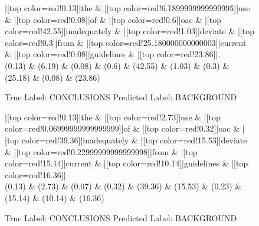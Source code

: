 \documentclass[a4paper, landscape]{article}
\begin{document}
\begin{figure}
\begin{center}
\begin{dependency}
\begin{deptext}
|[top color=red!0.13]|the \& |[top color=red!6.1899999999999995]|use \& |[top color=red!0.08]|of \& |[top color=red!0.6]|oac \& |[top color=red!42.55]|inadequately \& |[top color=red!1.03]|deviate \& |[top color=red!0.3]|from \& |[top color=red!25.180000000000003]|current \& |[top color=red!0.08]|guidelines \& |[top color=red!23.86]|.\\
(0.13) \& (6.19) \& (0.08) \& (0.6) \& (42.55) \& (1.03) \& (0.3) \& (25.18) \& (0.08) \& (23.86)\\
\end{deptext}
\end{dependency}
\end{center}
\caption{True Label: CONCLUSIONS Predicted Label: BACKGROUND}
\end{figure}
\clearpage
\begin{figure}
\begin{center}
\begin{dependency}
\begin{deptext}
|[top color=red!0.13]|the \& |[top color=red!2.73]|use \& |[top color=red!0.06999999999999999]|of \& |[top color=red!0.32]|oac \& |[top color=red!39.36]|inadequately \& |[top color=red!15.53]|deviate \& |[top color=red!0.22999999999999998]|from \& |[top color=red!15.14]|current \& |[top color=red!10.14]|guidelines \& |[top color=red!16.36]|.\\
(0.13) \& (2.73) \& (0.07) \& (0.32) \& (39.36) \& (15.53) \& (0.23) \& (15.14) \& (10.14) \& (16.36)\\
\end{deptext}
\end{dependency}
\end{center}
\caption{True Label: CONCLUSIONS Predicted Label: BACKGROUND}
\end{figure}
\end{document}
